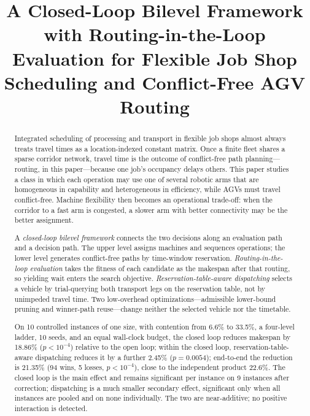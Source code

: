\documentclass[manuscript,screen,review]{acmart}
\newcommand{\NCases}{10}
\newcommand{\NSeeds}{10}
\newcommand{\GainLoopRule}{18.86\%}      %
\newcommand{\PLoopRule}{<10^{-4}}
\newcommand{\GainProbeLoop}{2.45\%}      %
\newcommand{\PProbeLoop}{=0.0054}
\newcommand{\GainEndToEnd}{21.35\%}      %
\newcommand{\PEndToEnd}{<10^{-4}}
\newcommand{\WinEndToEnd}{94}
\newcommand{\LoseEndToEnd}{5}
\newcommand{\GainIndepProduct}{22.6\%}
\newcommand{\CellsSigLoopAdj}{9}
\newcommand{\ContentionLo}{6.6\%}
\newcommand{\ContentionHi}{33.5\%}
\begin{document}
\title[Closed-Loop Bilevel Framework with Routing-in-the-Loop Evaluation]{A Closed-Loop Bilevel Framework with Routing-in-the-Loop Evaluation for Flexible Job Shop Scheduling and Conflict-Free AGV Routing}


\begin{abstract}
Integrated scheduling of processing and transport in flexible job shops almost always treats travel times as a location-indexed constant matrix.
Once a finite fleet shares a sparse corridor network, travel time is the outcome of conflict-free path planning---routing, in this paper---because one job's occupancy delays others.
This paper studies a class in which each operation may use one of several robotic arms that are homogeneous in capability and heterogeneous in efficiency, while AGVs must travel conflict-free.
Machine flexibility then becomes an operational trade-off: when the corridor to a fast arm is congested, a slower arm with better connectivity may be the better assignment.

A \emph{closed-loop bilevel framework} connects the two decisions along an evaluation path and a decision path.
The upper level assigns machines and sequences operations; the lower level generates conflict-free paths by time-window reservation.
\emph{Routing-in-the-loop evaluation} takes the fitness of each candidate as the makespan after that routing, so yielding wait enters the search objective.
\emph{Reservation-table-aware dispatching} selects a vehicle by trial-querying both transport legs on the reservation table, not by unimpeded travel time.
Two low-overhead optimizations---admissible lower-bound pruning and winner-path reuse---change neither the selected vehicle nor the timetable.

On \NCases{} controlled instances of one size, with contention from \ContentionLo{} to \ContentionHi{}, a four-level ladder, \NSeeds{} seeds, and an equal wall-clock budget, the closed loop reduces makespan by \GainLoopRule{} ($p\PLoopRule$) relative to the open loop;
within the closed loop, reservation-table-aware dispatching reduces it by a further \GainProbeLoop{} ($p\PProbeLoop$);
end-to-end the reduction is \GainEndToEnd{} (\WinEndToEnd{} wins, \LoseEndToEnd{} losses, $p\PEndToEnd$), close to the independent product \GainIndepProduct{}.
The closed loop is the main effect and remains significant per instance on \CellsSigLoopAdj{} instances after correction; dispatching is a much smaller secondary effect, significant only when all instances are pooled and on none individually.
The two are near-additive; no positive interaction is detected.
\end{abstract}
\end{document}

